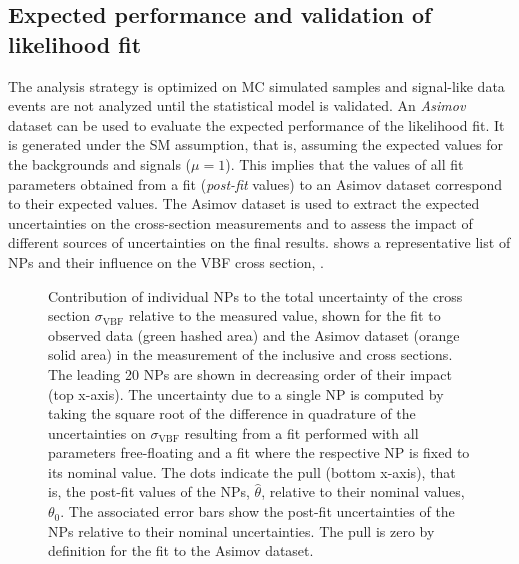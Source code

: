 \subsection{Expected performance and validation of likelihood fit}
\label{subsec:expected-performannce}
The analysis strategy is optimized on MC simulated samples and signal-like data events are not analyzed until the statistical model is validated.
An \emph{Asimov} dataset can be used to evaluate the expected performance of the likelihood fit. It is generated under the SM assumption, that is, assuming the expected values for the backgrounds and signals ($\mu=1$). 
This implies that the values of all fit parameters obtained from a fit (\emph{post-fit} values) to an Asimov dataset correspond to their expected values. 
The Asimov dataset is used to extract the expected uncertainties on the cross-section measurements and to assess the impact of different sources of uncertainties on the final results. 
 shows a representative list of NPs and their influence on the VBF cross section, \sigmaVBF. 
\begin{figure}[th]
    \centering
    {\caption{Contribution of individual NPs to the total uncertainty of the cross section $\sigma_{\mathrm{VBF}}$ relative to the measured value, shown for the fit to observed data (green hashed area) and the Asimov dataset (orange solid area) in the measurement of the inclusive \muVBF and \muGGF cross sections. The leading 20 NPs are shown in decreasing order of their impact (top x-axis).
    The uncertainty due to a single NP is computed by taking the square root of the difference in quadrature of the uncertainties on $\sigma_{\mathrm{VBF}}$ resulting from a fit performed with all parameters free-floating and a fit where the respective NP is fixed to its nominal value. 
    The dots indicate the pull (bottom x-axis), that is, the post-fit values of the NPs, $\hat{\theta}$, relative to their nominal values, $\theta_0$. 
    The associated error bars show the post-fit uncertainties of the NPs relative to their nominal uncertainties. 
    The pull is zero by definition for the fit to the Asimov dataset.
    \label{fig:fit:breakdown} }}
\end{figure}
